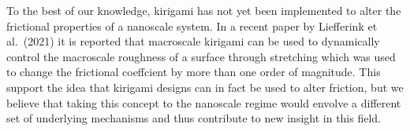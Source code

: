 To the best of our knowledge, kirigami has not yet been implemented to alter the
frictional properties of a nanoscale system. In a recent paper by Liefferink et
al.\ \cite{LIEFFERINK2021101475}(2021) it is reported that macroscale kirigami
can be used to dynamically control the macroscale roughness of a surface through
stretching which was used to change the frictional coeffcient by more than one
order of magnitude. This support the idea that kirigami designs can in fact be
used to alter friction, but we believe that taking this concept to the nanoscale
regime would envolve a different set of underlying mechanisms and thus
contribute to new insight in this field.












